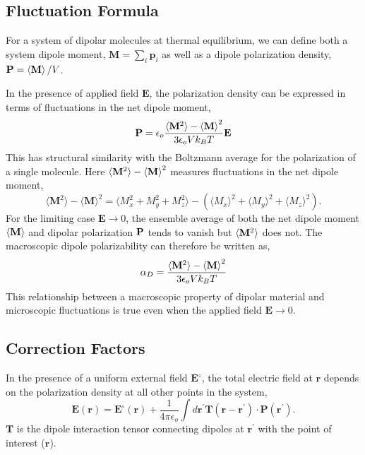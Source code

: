 \subsection{Fluctuation Formula}

For a system of dipolar molecules at thermal equilibrium, we can
define both a system dipole moment, $\mathbf{M} = \sum_i \mathbf{p}_i$
as well as a dipole polarization density,
$\mathbf{P} = \braket{\mathbf{M}}/V$.

In the presence of applied field $\mathbf{E}$, the polarization
density can be expressed in terms of fluctuations in the net dipole
moment,
\begin{equation}
\mathbf{P} = \epsilon_o \frac{\braket{\mathbf{M}^2}-{\braket{\mathbf{M}}}^2}{3 \epsilon_o V k_B T}\bf{E}
\label{flucDipole}
\end{equation}
This has structural similarity with the Boltzmann average for the
polarization of a single molecule. Here
$ \braket{\mathbf{M}^2}-{\braket{\mathbf{M}}}^2$ measures fluctuations
in the net dipole moment,
\begin{equation}
 \langle \mathbf{M}^2 \rangle - \langle \mathbf{M} \rangle^2 =
 \langle M_x^2+M_y^2+M_z^2 \rangle - \left( \langle M_x \rangle^2 +
   \langle M_y \rangle^2 +
   \langle M_z \rangle^2 \right).
\label{eq:flucDip}
\end{equation}
For the limiting case $\textbf{E} \rightarrow 0 $, the ensemble
average of both the net dipole moment $\braket{\mathbf{M}}$ and
dipolar polarization $\bf{P}$ tends to vanish but
$\braket{\mathbf{M}^2}$ does not.  The macroscopic dipole
polarizability can therefore be written as,
\begin{equation}
  \alpha_D = \frac{\braket{\mathbf{M}^2}-{\braket{\mathbf{M}}}^2}{3 \epsilon_o V k_B T}
\end{equation}
This relationship between a macroscopic property of dipolar material
and microscopic fluctuations is true even when the applied field
$ \textbf{E} \rightarrow 0 $.

\subsection{Correction Factors}
\label{sec:corrFactor}
In the presence of a uniform external field $ \mathbf{E}^\circ$, the
total electric field at $\mathbf{r}$ depends on the polarization
density at all other points in the system,\cite{NeumannI83}
\begin{equation}
\mathbf{E}(\mathbf{r}) = \mathbf{E}^\circ(\mathbf{r}) +
\frac{1}{4\pi\epsilon_o} \int d\mathbf{r}^\prime
\mathbf{T}(\mathbf{r}-\mathbf{r}^\prime)\cdot
{\mathbf{P}(\mathbf{r}^\prime)}.
\label{eq:localField}
\end{equation}
$\mathbf{T}$ is the dipole interaction tensor connecting dipoles at
$\mathbf{r}^\prime$ with the point of interest ($\mathbf{r}$).

